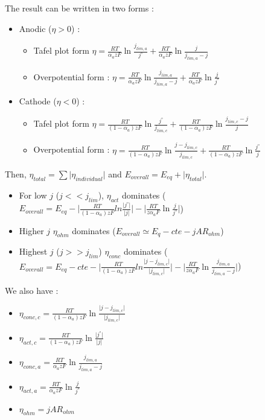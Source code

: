 \documentclass[../main.tex]{subfiles}
\begin{document}
The result can be written in two forms : \begin{itemize}
    \item Anodic ($\eta >0$) : \begin{itemize}
        \item Tafel plot form $\eta = \frac{RT}{\alpha_a zF} \ln \frac{j_{lim,a}}{j^\circ} +  \frac{RT}{\alpha_a zF} \ln \frac{j}{j_{lim,a}-j}$
        \item Overpotential form : $\eta =  \frac{RT}{\alpha_a zF} \ln \frac{j_{lim,a}}{j_{lim,a}-j} +  \frac{RT}{\alpha_a zF} \ln \frac{j}{j^\circ}$
    \end{itemize}
    \item Cathode ($\eta <0$) : \begin{itemize}
        \item Tafel plot form $\eta = \frac{RT}{(1-\alpha_a) zF} \ln \frac{j^\circ}{j_{lim,c}} +  \frac{RT}{(1-\alpha_a) zF} \ln \frac{j_{lim,c}-j}{j}$
        \item Overpotential form : $\eta =  \frac{RT}{(1-\alpha_a) zF} \ln \frac{j-j_{lim,c}}{j_{lim,c}} +  \frac{RT}{(1-\alpha_a) zF} \ln \frac{j^\circ}{j}$
    \end{itemize}
\end{itemize}

Then, $\eta_{total} = \sum \lvert \eta_{individual} \rvert$ and $E_{overall} = E_{eq} + \lvert \eta_{total} \rvert$.\\

\begin{itemize}
    \item For low $j$ ($j<< j_{lim}$), $\eta_{act}$ dominates ($E_{overall} = E_{eq} - \lvert \frac{RT}{(1-\alpha_a) zF} ln \frac{\lvert j^\circ \rvert}{\lvert j\rvert} \rvert - \lvert \frac{RT}{z\alpha_a F} \ln \frac{j}{j^\circ} \rvert$)
    \item Higher $j$ $\eta_{ohm}$ dominates ($E_{overall} \simeq E_q - cte - j AR_{ohm}$)
    \item Highest $j$ ($j>> j_{lim}$) $\eta_{conc}$ dominates ($E_{overall} = E_{eq}-cte - \lvert \frac{RT}{(1-\alpha_a) zF} ln \frac{\lvert j-j_{lim,c} \rvert}{\lvert j_{lim,c} \rvert} \rvert - \lvert \frac{RT}{z\alpha_a F} \ln \frac{j_{lim,a}}{j_{lim,a} - j} \rvert$)
\end{itemize}

We also have : \begin{itemize}
    \item $\eta_{conc,c} = \frac{RT}{(1-\alpha_a) zF} \ln \frac{\lvert j-j_{lim,c} \rvert}{\lvert j_{lim,c} \rvert}$
    \item $\eta_{act,c} = \frac{RT}{(1-\alpha_a) zF} \ln \frac{\lvert j^\circ \rvert}{\lvert j \rvert}$
    \item $\eta_{conc,a} = \frac{RT}{\alpha_a zF} \ln \frac{j_{lim,a} }{ j_{lim,a}-j}$
    \item $\eta_{act,a} = \frac{RT}{\alpha_a zF} \ln \frac{j}{j^\circ}$
    \item $\eta_{ohm} = jAR_{ohm}$
\end{itemize}
\end{document}
